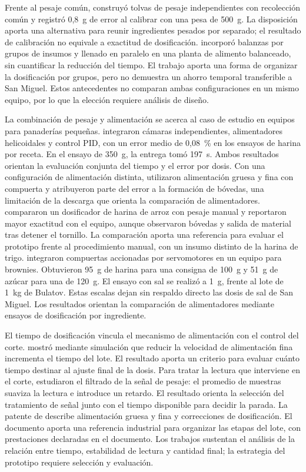 Frente al pesaje común, \textcite{laime2022dosificacion} construyó tolvas
de pesaje independientes con recolección común y registró 0,8~g de error
al calibrar con una pesa de 500~g. La disposición aporta una alternativa
para reunir ingredientes pesados por separado; el resultado de calibración
no equivale a exactitud de dosificación. \textcite{sanchez2024tolvas}
incorporó balanzas por grupos de insumos y llenado en paralelo en una
planta de alimento balanceado, sin cuantificar la reducción del tiempo.
El trabajo aporta una forma de organizar la dosificación por grupos,
pero no demuestra un ahorro temporal transferible a San Miguel. Estos
antecedentes no comparan ambas configuraciones en un mismo equipo,
por lo que la elección requiere análisis de diseño.

La combinación de pesaje y alimentación se acerca al caso de estudio en
equipos para panaderías pequeñas. \textcite{humaira2024optimalisasi} integraron
cámaras independientes, alimentadores helicoidales y control PID,
con un error medio de 0,08~\% en los ensayos de harina por receta.
En el ensayo de 350~g, la entrega tomó 197~s. Ambos resultados orientan
la evaluación conjunta del tiempo y el error por dosis. Con una
configuración de alimentación distinta, \textcite{rumapea2026flour} utilizaron alimentación
gruesa y fina con compuerta y atribuyeron parte del error a la formación
de bóvedas, una limitación de la descarga que orienta la comparación de
alimentadores. \textcite{afni2026cake} compararon un dosificador de harina
de arroz con pesaje manual y reportaron mayor exactitud con el equipo,
aunque observaron bóvedas y salida de material tras detener el tornillo.
La comparación aporta una referencia para evaluar el prototipo frente
al procedimiento manual, con un insumo distinto de la harina de trigo.
\textcite{bachtiar2026brownies} integraron compuertas accionadas por
servomotores en un equipo para brownies. Obtuvieron 95~g de harina
para una consigna de 100~g y 51~g de azúcar para una de 120~g.
El ensayo con sal se realizó a 1~g, frente al lote de 1~kg de Bulatov.
Estas escalas dejan sin respaldo directo las dosis de sal de San Miguel.
Los resultados orientan la comparación de alimentadores mediante
ensayos de dosificación por ingrediente.

El tiempo de dosificación vincula el mecanismo de alimentación con el
control del corte.
\textcite{wang2025batching} mostró mediante simulación que reducir la
velocidad de alimentación fina incrementa el tiempo del lote. El
resultado aporta un criterio para evaluar cuánto tiempo destinar al
ajuste final de la dosis.
Para tratar la lectura que interviene en el corte,
\textcite{zengin2025fir} estudiaron el filtrado de la señal de pesaje:
el promedio de muestras suaviza la lectura e introduce un retardo.
El resultado orienta la selección del tratamiento de señal junto con
el tiempo disponible para decidir la parada. La patente de
\textcite{buhler2022dosing} describe alimentación gruesa y fina y
correcciones de dosificación. El documento aporta una referencia industrial para
organizar las etapas del lote, con prestaciones declaradas en el documento.
Los trabajos sustentan el análisis de la
relación entre tiempo, estabilidad de lectura y cantidad final; la
estrategia del prototipo requiere selección y evaluación.

